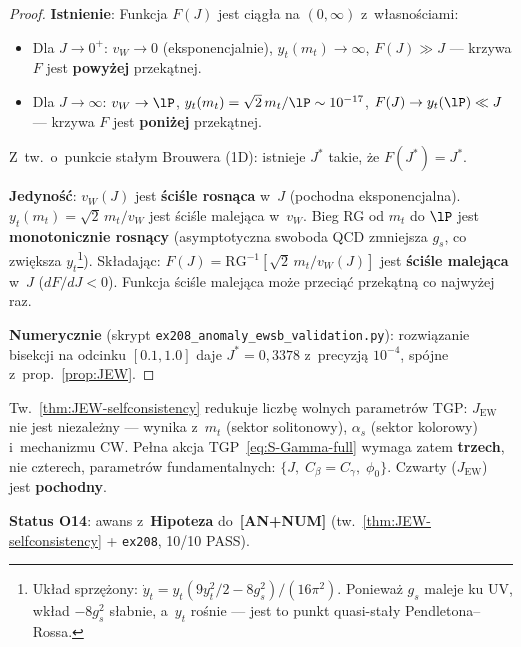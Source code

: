 \begin{proof}
\textbf{Istnienie}:
Funkcja $F(J)$ jest ci\k{a}g\l{}a na $(0, \infty)$ z~w\l{}asno\'sciami:
\begin{itemize}[nosep]
  \item Dla $J \to 0^+$: $v_W \to 0$ (eksponencjalnie),
    $y_t(m_t) \to \infty$, $F(J) \gg J$ --- krzywa $F$ jest
    \textbf{powy\.zej} przek\k{a}tnej.
  \item Dla $J \to \infty$: $v_W \to \lP$,
    $y_t(m_t) = \sqrt{2}\,m_t/\lP \sim 10^{-17}$,
    $F(J) \to y_t(\lP) \ll J$ --- krzywa $F$ jest
    \textbf{poni\.zej} przek\k{a}tnej.
\end{itemize}
Z~tw.~o~punkcie sta\l{}ym Brouwera (1D): istnieje $J^*$
takie, \.ze $F(J^*) = J^*$.

\textbf{Jedyno\'s\'c}:
$v_W(J)$ jest \textbf{\'sci\'sle rosn\k{a}ca} w~$J$ (pochodna
eksponencjalna).
$y_t(m_t) = \sqrt{2}\,m_t / v_W$ jest \'sci\'sle malej\k{a}ca
w~$v_W$.
Bieg RG od $m_t$ do $\lP$ jest \textbf{monotonicznie rosn\k{a}cy}
(asymptotyczna swoboda QCD zmniejsza $g_s$, co zwi\k{e}ksza
$y_t$\footnote{Uk\l{}ad sprz\k{e}\.zony: $\dot{y}_t = y_t(9y_t^2/2
- 8g_s^2)/(16\pi^2)$. Poniewa\.z $g_s$ maleje ku UV, wk\l{}ad
$-8g_s^2$ s\l{}abnie, a~$y_t$ ro\'snie --- jest to punkt
quasi-sta\l{}y Pendletona--Rossa.}).
Sk\l{}adaj\k{a}c: $F(J) = \mathrm{RG}^{-1}[\sqrt{2}\,m_t / v_W(J)]$
jest \textbf{\'sci\'sle malej\k{a}ca} w~$J$ ($dF/dJ < 0$).
Funkcja \'sci\'sle malej\k{a}ca mo\.ze przeci\k{a}\'c przek\k{a}tn\k{a}
co najwy\.zej raz.

\textbf{Numerycznie} (skrypt \texttt{ex208\_anomaly\_ewsb\_validation.py}):
rozwi\k{a}zanie bisekcji na odcinku $[0.1, 1.0]$ daje
$J^* = 0{,}3378$ z~precyzj\k{a} $10^{-4}$, sp\'ojne
z~prop.~\ref{prop:JEW}.
\end{proof}

\begin{remark}\label{rem:JEW-parameter-count}
Tw.~\ref{thm:JEW-selfconsistency} redukuje liczb\k{e} wolnych
parametr\'ow TGP: $J_{\mathrm{EW}}$ nie jest niezale\.zny ---
wynika z~$m_t$ (sektor solitonowy), $\alpha_s$ (sektor kolorowy)
i~mechanizmu CW. Pe\l{}na akcja TGP~\eqref{eq:S-Gamma-full}
wymaga zatem \textbf{trzech}, nie czterech, parametr\'ow
fundamentalnych: $\{J,\; C_\beta = C_\gamma,\; \phi_0\}$.
Czwarty ($J_{\mathrm{EW}}$) jest \textbf{pochodny}.

\medskip\noindent
\textbf{Status O14}: awans z~\textbf{Hipoteza} do~\textbf{[AN+NUM]}
(tw.~\ref{thm:JEW-selfconsistency} + \texttt{ex208}, 10/10 PASS).
\end{remark}

